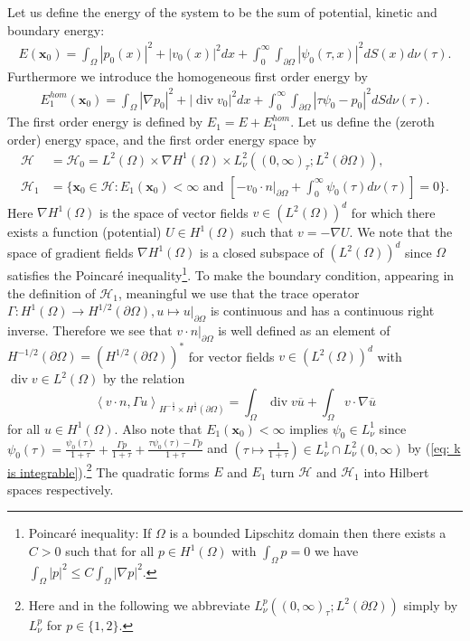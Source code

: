 \documentclass{amsart}
\newcommand{\abs}[1]{\left|#1\right|}
\newcommand{\dual}[2]{\left\langle #1 , #2\right\rangle}
\newcommand{\xnice}{\mathbf{x}}
\newcommand{\Ho}{\mathcal{H}}
\DeclareMathOperator{\Div}{div}
\begin{document}
Let us define the energy of the system to be the sum of potential, kinetic and boundary energy:
\begin{align*}
  E(\xnice_0) = \int_{\Omega} \abs{p_0(x)}^2 + \abs{v_0(x)}^2 dx + \int_0^{\infty}\int_{\partial\Omega} \abs{\psi_0(\tau,x)}^2 dS(x) d\nu(\tau) .
\end{align*}
Furthermore we introduce the homogeneous first order energy by
\begin{align*}
  E_1^{hom}(\xnice_0) =  \int_{\Omega} \abs{\nabla p_0}^2 + \abs{\Div v_0}^2 dx + \int_0^{\infty}\int_{\partial\Omega} \abs{\tau\psi_0-p_0}^2 dS d\nu(\tau).
\end{align*}
The first order energy is defined by $E_1=E+E_1^{hom}$. Let us define the (zeroth order) energy space, and the first order energy space by
\begin{align}
 \label{eq: energy space}
 \Ho &= \Ho_0= L^2(\Omega) \times \nabla H^1(\Omega) \times L^2_{\nu}((0,\infty)_{\tau}; L^2(\partial\Omega)) , \\
 \label{eq: first order energy space}
 \Ho_1 &= \{\xnice_0\in\Ho: E_1(\xnice_0)<\infty \text{ and } \left[-v_0\cdot n|_{\partial\Omega} + \int_0^{\infty} \psi_0(\tau) d\nu(\tau)\right] = 0\} .
\end{align}
Here $\nabla H^1(\Omega)$ is the space of vector fields $v\in (L^2(\Omega))^d$ for which there exists a function (potential) $U\in H^1(\Omega)$ such that $v=-\nabla U$. We note that the space of gradient fields $\nabla H^1(\Omega)$ is a closed subspace of $(L^2(\Omega))^d$ since $\Omega$ satisfies the Poincar\'e inequality\footnote{Poincar\'e inequality: If $\Omega$ is a bounded Lipschitz domain then there exists a $C>0$ such that for all $p\in H^1(\Omega)$ with  $\int_{\Omega}p=0$ we have $\int_{\Omega}\abs{p}^2 \leq C\int_{\Omega}\abs{\nabla p}^2$.}. To make the boundary condition, appearing in the definition of $\Ho_1$, meaningful we use that the trace operator $\Gamma:H^1(\Omega)\rightarrow H^{1/2}(\partial\Omega), u\mapsto u|_{\partial\Omega}$ is continuous and has a continuous right inverse. Therefore we see that $v\cdot n |_{\partial\Omega}$ is well defined as an element of $H^{-1/2}(\partial\Omega)=(H^{1/2}(\partial\Omega))^*$ for vector fields $v\in (L^2(\Omega))^d$ with $\Div v\in L^2(\Omega)$ by the relation
\begin{equation}\label{eq: vn}
 \dual{v\cdot n}{\Gamma u}_{H^{-\frac{1}{2}}\times H^{\frac{1}{2}}(\partial\Omega)} 
 = \int_{\Omega} \Div v \overline{u} + \int_{\Omega} v\cdot\nabla \overline{u}
\end{equation}
for all $u\in H^1(\Omega)$. Also note that $E_1(\xnice_0)<\infty$ implies $\psi_0\in L^1_{\nu}$ since $\psi_0(\tau)=\frac{\psi_0(\tau)}{1+\tau}+\frac{\Gamma p}{1+\tau}+\frac{\tau\psi_0(\tau)-\Gamma p}{1+\tau}$ and $(\tau\mapsto \frac{1}{1+\tau})\in L^1_{\nu}\cap L^2_{\nu}(0,\infty)$ by (\ref{eq: k is integrable}).\footnote{Here and in the following we abbreviate $L^p_{\nu}((0,\infty)_{\tau}; L^2(\partial\Omega))$ simply by $L^p_{\nu}$ for $p\in\{1,2\}$.} The quadratic forms $E$ and $E_1$ turn $\Ho$ and $\Ho_1$ into Hilbert spaces respectively.
\end{document}
